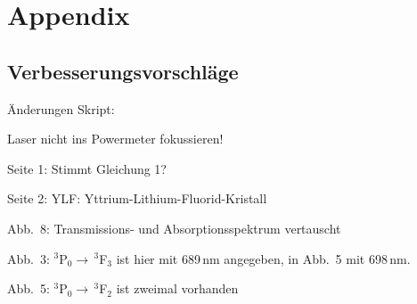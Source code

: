 \section{Appendix}

\subsection{Verbesserungsvorschläge}

Änderungen Skript:

Laser nicht ins Powermeter fokussieren!

Seite 1: Stimmt Gleichung 1?

Seite 2: YLF: Yttrium-Lithium-Fluorid-Kristall

Abb.~8: Transmissions- und Absorptionsspektrum vertauscht

Abb.~3: $^3$P$_0 \rightarrow\,^3$F$_3$ ist hier mit 689\,nm angegeben, in Abb.~5 mit 698\,nm.

Abb.~5: $^3$P$_0 \rightarrow\,^3$F$_2$ ist zweimal vorhanden

